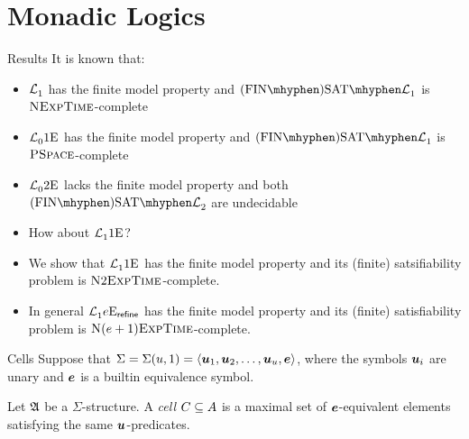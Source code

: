 \documentclass{beamer}
\begin{document}
\section{Monadic Logics}
\begin{frame}{Results}
It is known that:
\begin{itemize}
  \item $\mathcal{L}^{{}}_{1}$ has the finite model property and
  $\FinASat{\Lvp\LL\nonv1}$ is $\text{\normalfont{\scshape NExpTime}}$-complete
  \item $\mathcal{L}^{{}}_{0}{1}\mathrm{E}_{{}}$ has the finite model property and
  $\FinASat{\Lvp\LL\nonv1}$ is $\text{\normalfont{\scshape PSpace}}$-complete
  \item $\mathcal{L}^{{}}_{0}{2}\mathrm{E}_{{}}$ lacks the finite model property and both
  $\FinASat{\Lvp\LL\nonv2}$ are undecidable
  \pause
  \item How about $\mathcal{L}^{{}}_{1}{1}\mathrm{E}_{{}}$?
  \pause
  \item We show that $\mathcal{L}^{{}}_{1}{1}\mathrm{E}_{{}}$ has the finite model property and
  its (finite) satsifiability problem is $\text{\normalfont{\scshape N}}2\text{\normalfont{\scshape ExpTime}}$-complete.
  \item In general $\mathcal{L}^{{}}_{1}{e}\mathrm{E}_{\mathsf{refine}}$ has the finite model
  property and its (finite) satisfiability problem is
  $\text{\normalfont{\scshape N}}(e+1)\text{\normalfont{\scshape ExpTime}}$-complete.
\end{itemize}
\end{frame}

\begin{frame}{Cells}
Suppose that $\Sigma = \Sigma(u,1) = \left\langle \bm{u}_{1},\bm{u}_{2},\dots,\bm{u}_{u},\bm{e} \right\rangle$,
where the symbols $\bm{u}_{i}$ are unary and $\bm{e}$ is a builtin equivalence symbol.

Let $\mathfrak{A}$ be a $\Sigma$-structure.
A \emph{cell} $C\subseteq A$ is a maximal set of $\bm{e}$-equivalent elements
satisfying the same $\bm{u}$-predicates.
\end{frame}
\end{document}

